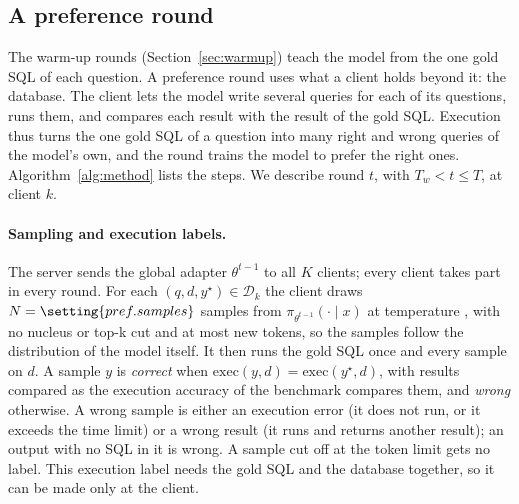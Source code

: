 \subsection{A preference round}\label{sec:pref-round}

The warm-up rounds (Section~\ref{sec:warmup}) teach the model from the one gold SQL of each question. A preference round uses what a client holds beyond it: the database. The client lets the model write several queries for each of its questions, runs them, and compares each result with the result of the gold SQL. Execution thus turns the one gold SQL of a question into many right and wrong queries of the model's own, and the round trains the model to prefer the right ones. Algorithm~\ref{alg:method} lists the steps. We describe round $t$, with $T_w < t \le T$, at client $k$.

\paragraph{Sampling and execution labels.}
The server sends the global adapter $\theta^{t-1}$ to all $K$ clients; every client takes part in every round. For each $(q, d, y^\star) \in \mathcal{D}_k$ the client draws $N = \setting{pref.samples}$ samples from $\pi_{\theta^{t-1}}(\cdot \mid x)$ at temperature , with no nucleus or top-k cut and at most  new tokens, so the samples follow the distribution of the model itself. It then runs the gold SQL once and every sample on $d$. A sample $y$ is \emph{correct} when $\mathrm{exec}(y, d) = \mathrm{exec}(y^\star, d)$, with results compared as the execution accuracy of the benchmark compares them, and \emph{wrong} otherwise. A wrong sample is either an execution error (it does not run, or it exceeds the time limit) or a wrong result (it runs and returns another result); an output with no SQL in it is wrong. A sample cut off at the token limit gets no label. This execution label needs the gold SQL and the database together, so it can be made only at the client.

